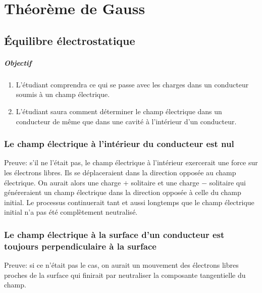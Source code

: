 \chapter{Théorème de Gauss}


\section{Équilibre électrostatique}


\paragraph{Objectif}

\begin{enumerate}
  \item L'étudiant comprendra ce qui se passe avec les charges dans un
    conducteur soumis à un champ électrique.
  \item L'étudiant saura comment déterminer le champ électrique dans un
    conducteur de même que dans une cavité à l'intérieur d'un conducteur.
\end{enumerate}


\subsection*{Le champ électrique à l'intérieur du conducteur est nul}

Preuve: s'il ne l'était pas, le champ électrique à l'intérieur exercerait une
force sur les électrons libres. Ils se déplaceraient dans la direction opposée
au champ électrique. On aurait alors une charge $+$ solitaire et une charge $-$
solitaire qui généreraient un champ électrique dans la direction opposée à
celle du champ initial. Le processus continuerait tant et aussi longtemps que
le champ électrique initial n'a pas été complètement neutralisé.



\subsection*{Le champ électrique à la surface d'un conducteur est toujours
  perpendiculaire à la surface}

Preuve: si ce n'était pas le cas, on aurait un mouvement des électrons libres
proches de la surface qui finirait par neutraliser la composante tangentielle
du champ.



